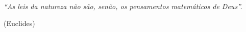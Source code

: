 \begin{center}
\vspace*{\fill}
\hspace{.45\textwidth} %
    \begin{minipage}{.5\textwidth}
    \flushright
    \noindent \textit{``As leis da natureza não são, senão, os pensamentos matemáticos de Deus''.}
    
    (Euclides)
    \end{minipage}
\end{center}
